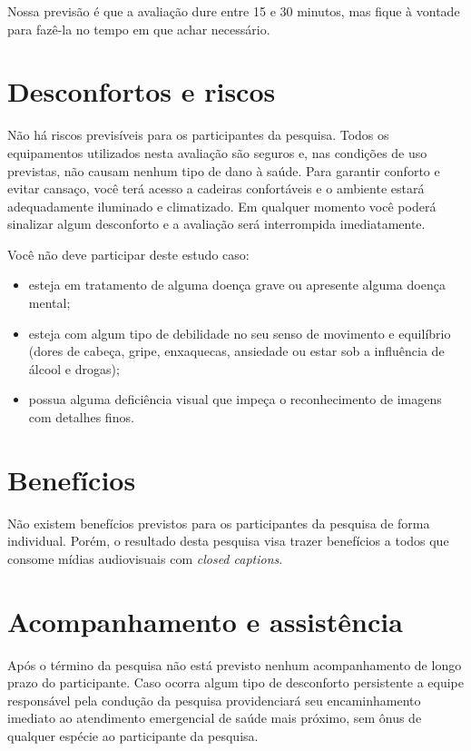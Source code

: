 \documentclass[a4paper,11pt,titlepage,singlespacing]{article}
\begin{document}
Nossa previsão é que a avaliação dure entre 15 e 30 minutos, mas fique à vontade para fazê-la no tempo em que achar necessário.



\section*{Desconfortos e riscos}

\noindent Não há riscos previsíveis para os participantes da pesquisa. Todos os equipamentos utilizados nesta avaliação são seguros e, nas condições de uso previstas, não causam nenhum tipo de dano à saúde. Para garantir conforto e evitar cansaço, você terá acesso a cadeiras confortáveis e o ambiente estará adequadamente iluminado e climatizado. Em qualquer momento você poderá sinalizar algum desconforto e a avaliação será interrompida imediatamente.

Você não deve participar deste estudo caso:

\begin{itemize}
\item esteja em tratamento de alguma doença grave ou apresente alguma doença mental;
\item esteja com algum tipo de debilidade no seu senso de movimento e equilíbrio (dores de cabeça, gripe, enxaquecas, ansiedade ou estar sob a influência de álcool e drogas);
\item possua alguma deficiência visual que impeça o reconhecimento de imagens com detalhes finos.
\end{itemize}

\section*{Benefícios}

\noindent Não existem benefícios previstos para os participantes da pesquisa de forma individual. Porém, o resultado desta pesquisa visa trazer benefícios a todos que consome mídias audiovisuais com \textit{closed captions}.

\section*{Acompanhamento e assistência}

\noindent Após o término da pesquisa não está previsto nenhum acompanhamento de longo prazo do participante. Caso ocorra algum tipo de desconforto persistente a equipe responsável pela condução da pesquisa providenciará seu encaminhamento imediato ao atendimento emergencial de saúde mais próximo, sem ônus de qualquer espécie ao participante da pesquisa.
\end{document}
